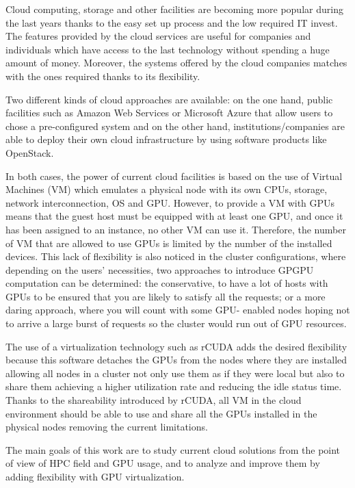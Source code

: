\documentclass[a4paper,twoside]{article}
\begin{document}
Cloud computing, storage and other facilities are becoming 
more popular during the last years thanks to the easy set up 
process and the low required IT invest. The features provided 
by the cloud services are useful for companies and individuals 
which have access to the last technology without spending a 
huge amount of money. Moreover, the systems offered by the cloud 
companies matches with the ones required thanks to its flexibility.

Two different kinds of cloud approaches are available:
on the one hand, public facilities such as Amazon Web Services or 
Microsoft Azure that allow users to chose a pre-configured system  
and on the other hand, institutions/companies 
are able to deploy their own cloud infrastructure by using software products 
like OpenStack.  

In both cases, the power of current cloud facilities is based on the use 
of Virtual Machines (VM) which  
emulates a physical node with its own 
CPUs, storage, network interconnection, OS and GPU. 
However, to provide a VM with GPUs means
that the guest host must be equipped with at least one GPU, and
once it has been assigned to an instance, no other VM can use
it. Therefore, the number of VM that are allowed to use GPUs is 
limited by the number of the installed devices. This lack of 
flexibility is also noticed in the cluster configurations, where 
depending on the users’ necessities, 
two approaches to introduce GPGPU computation can be determined:
the conservative, to have a lot of hosts with GPUs to be
ensured that you are likely to satisfy all the requests; or a
more daring approach, where you will count with some GPU-
enabled nodes hoping not to arrive a large burst of requests
so the cluster would run out of GPU resources.

The use of a virtualization technology such as {rCUDA} adds 
the desired flexibility because this software detaches the GPUs 
from the nodes where they are installed allowing all nodes in a cluster
not only use them as if they were local but also to share them 
achieving a higher utilization rate and reducing the idle status time.
Thanks to the shareability introduced by {rCUDA}, all VM in the cloud 
environment should be able to use and share all the GPUs installed in 
the physical nodes removing the current limitations. 

The main goals of this work are to study current cloud solutions from 
the point of view of HPC field and GPU usage, and to analyze and improve 
them by adding flexibility with GPU virtualization.
\end{document}
